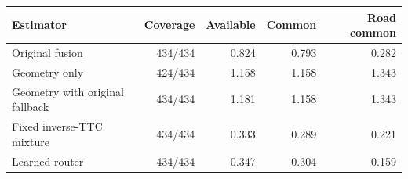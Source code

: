 \begin{tabular}{lrrrr}
\toprule
Estimator & Coverage & Available & Common & Road common \\
\midrule
Original fusion & 434/434 & 0.824 & 0.793 & 0.282 \\
Geometry only & 424/434 & 1.158 & 1.158 & 1.343 \\
Geometry with original fallback & 434/434 & 1.181 & 1.158 & 1.343 \\
Fixed inverse-TTC mixture & 434/434 & 0.333 & 0.289 & 0.221 \\
Learned router & 434/434 & 0.347 & 0.304 & 0.159 \\
\bottomrule
\end{tabular}
